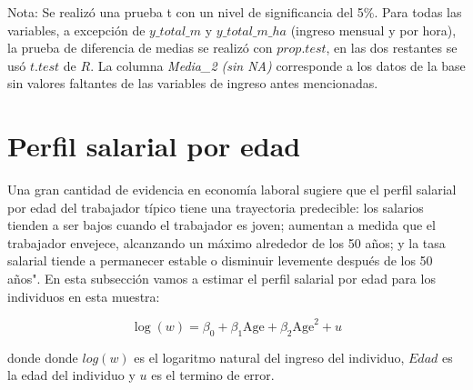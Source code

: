 \documentclass[12pt,a4paper,onecolumn]{article}
\begin{document}
\begin{table}[ht]
{\begin{tabular}{lrrrrrrl}
\end{tabular}
}
\begin{minipage}{16cm}
\tiny Nota: Se realizó una prueba t con un nivel de significancia del 5\%. Para todas las variables, a excepción de $y\_total\_m$ y $y\_total\_m\_ha$ (ingreso mensual y por hora), la prueba de diferencia de medias se realizó con $prop.test$, en las dos restantes se usó $t.test$ de $R$. La columna \textit{Media\_2 (sin NA)} corresponde a los datos de la base sin valores faltantes de las variables de ingreso antes mencionadas. 
\end{minipage}
\end{table}

\bigbreak

\section{Perfil salarial por edad}

Una gran cantidad de evidencia en economía laboral sugiere que el perfil salarial por edad del trabajador típico tiene una trayectoria predecible: los salarios tienden a ser bajos cuando el trabajador es joven; aumentan a medida que el trabajador envejece, alcanzando un máximo alrededor de los 50 años; y la tasa salarial tiende a permanecer estable o disminuir levemente después de los 50 años".
\bigbreak 
En esta subsección vamos a estimar el perfil salarial por edad para los individuos en esta muestra:

\begin{equation}
    \log(w) = \beta_0 + \beta_1 \text{Age} + \beta_2 \text{Age}^2 + u
    \label{eq:age_wage}
\end{equation}

\bigbreak
donde donde $log(w)$ es el logaritmo natural del ingreso del individuo, $Edad$ es la edad del individuo y $u$ es el termino de error.

\end{document}
